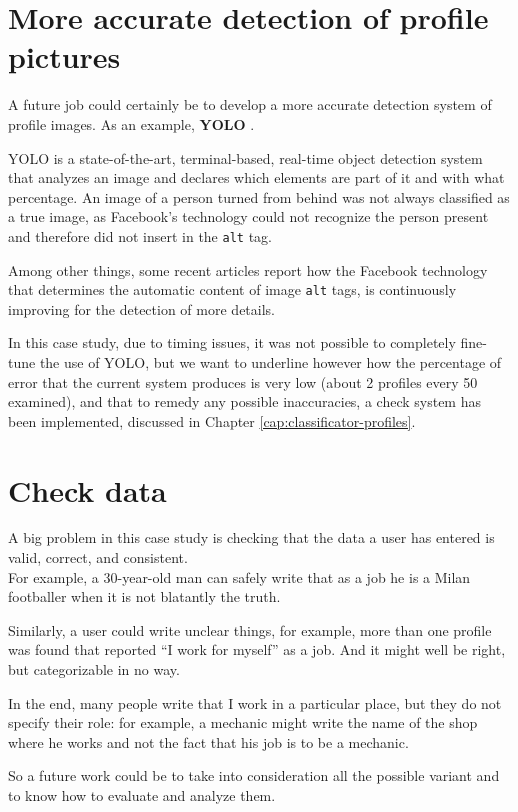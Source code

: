 \section{More accurate detection of profile pictures}
A future job could certainly be to develop a more accurate detection system of profile images. As an example, \textbf{YOLO} \parencite{site:YOLO}.\par \noindent 
YOLO is a state-of-the-art, terminal-based, real-time object detection system that analyzes an image and declares which elements are part of it and with what percentage. An image of a person turned from behind was not always classified as a true image, as Facebook's technology could not recognize the person present and therefore did not insert in the \texttt{alt} tag.\par \noindent 
Among other things, some recent articles report how the Facebook technology that determines the automatic content of image \texttt{alt} tags, is continuously improving for the detection of more details.\par \noindent 
In this case study, due to timing issues, it was not possible to completely fine-tune the use of YOLO, but we want to underline however how the percentage of error that the current system produces is very low (about 2 profiles every 50 examined), and that to remedy any possible inaccuracies, a check system has been implemented, discussed in Chapter \ref{cap:classificator-profiles}.

\section{Check data}
A big problem in this case study is checking that the data a user has entered is valid, correct, and consistent.
\\For example, a 30-year-old man can safely write that as a job he is a Milan footballer when it is not blatantly the truth. \par \noindent Similarly, a user could write unclear things, for example, more than one profile was found that reported ``I work for myself'' as a job. And it might well be right, but categorizable in no way. \par \noindent In the end, many people write that I work in a particular place, but they do not specify their role: for example, a mechanic might write the name of the shop where he works and not the fact that his job is to be a mechanic.
\par \noindent So a future work could be to take into consideration all the possible variant and to know how to evaluate and analyze them.
